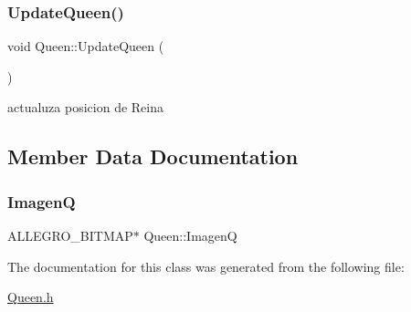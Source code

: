 \mbox{\label{class_queen_a203ca68e74de0eab8e4781e3d8b3edc7}} 
\subsubsection{\texorpdfstring{Update\+Queen()}{UpdateQueen()}}
{\footnotesize\ttfamily void Queen\+::\+Update\+Queen (\begin{DoxyParamCaption}{ }\end{DoxyParamCaption})}



actualuza posicion de Reina 



\subsection{Member Data Documentation}
\mbox{\label{class_queen_a5b3e95f5f8470dd753a667c378605d3b}} 
\subsubsection{\texorpdfstring{ImagenQ}{ImagenQ}}
{\footnotesize\ttfamily A\+L\+L\+E\+G\+R\+O\+\_\+\+B\+I\+T\+M\+AP$\ast$ Queen\+::\+ImagenQ}



The documentation for this class was generated from the following file\+:\begin{DoxyCompactItemize}
\item 
\hyperlink{_queen_8h}{Queen.\+h}\end{DoxyCompactItemize}
